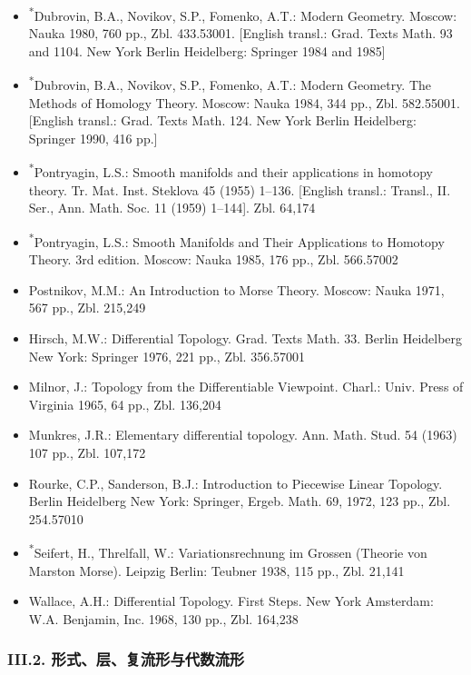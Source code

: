 \begin{itemize}
\item \textsuperscript{*}Dubrovin, B.A., Novikov, S.P., Fomenko, A.T.: Modern Geometry. Moscow: Nauka 1980, 760 pp., Zbl. 433.53001. [English transl.: Grad. Texts Math. 93 and 1104. New York Berlin Heidelberg: Springer 1984 and 1985]
\item \textsuperscript{*}Dubrovin, B.A., Novikov, S.P., Fomenko, A.T.: Modern Geometry. The Methods of Homology Theory. Moscow: Nauka 1984, 344 pp., Zbl. 582.55001. [English transl.: Grad. Texts Math. 124. New York Berlin Heidelberg: Springer 1990, 416 pp.]
\item \textsuperscript{*}Pontryagin, L.S.: Smooth manifolds and their applications in homotopy theory. Tr. Mat. Inst. Steklova 45 (1955) 1--136. [English transl.: Transl., II. Ser., Ann. Math. Soc. 11 (1959) 1--144]. Zbl. 64,174
\item \textsuperscript{*}Pontryagin, L.S.: Smooth Manifolds and Their Applications to Homotopy Theory. 3rd edition. Moscow: Nauka 1985, 176 pp., Zbl. 566.57002
\item Postnikov, M.M.: An Introduction to Morse Theory. Moscow: Nauka 1971, 567 pp., Zbl. 215,249
\item Hirsch, M.W.: Differential Topology. Grad. Texts Math. 33. Berlin Heidelberg New York: Springer 1976, 221 pp., Zbl. 356.57001
\item Milnor, J.: Topology from the Differentiable Viewpoint. Charl.: Univ. Press of Virginia 1965, 64 pp., Zbl. 136,204
\item Munkres, J.R.: Elementary differential topology. Ann. Math. Stud. 54 (1963) 107 pp., Zbl. 107,172
\item Rourke, C.P., Sanderson, B.J.: Introduction to Piecewise Linear Topology. Berlin Heidelberg New York: Springer, Ergeb. Math. 69, 1972, 123 pp., Zbl. 254.57010
\item \textsuperscript{*}Seifert, H., Threlfall, W.: Variationsrechnung im Grossen (Theorie von Marston Morse). Leipzig Berlin: Teubner 1938, 115 pp., Zbl. 21,141
\item Wallace, A.H.: Differential Topology. First Steps. New York Amsterdam: W.A. Benjamin, Inc. 1968, 130 pp., Zbl. 164,238
\end{itemize}

\subsubsection*{III.2. 形式、层、复流形与代数流形}

